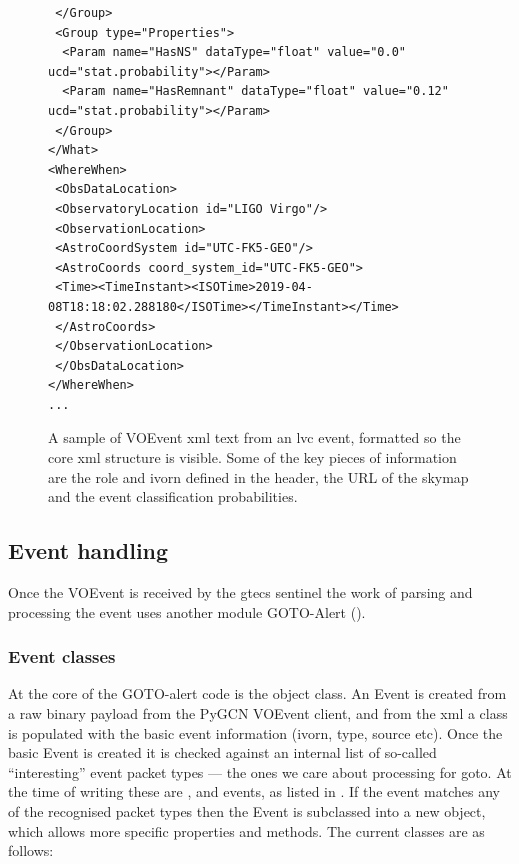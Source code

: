 \begin{colsection}
\begin{colsection}
\begin{figure}[p]
\begin{lstlisting}
 </Group>
 <Group type="Properties">
  <Param name="HasNS" dataType="float" value="0.0" ucd="stat.probability"></Param>
  <Param name="HasRemnant" dataType="float" value="0.12" ucd="stat.probability"></Param>
 </Group>
</What>
<WhereWhen>
 <ObsDataLocation>
 <ObservatoryLocation id="LIGO Virgo"/>
 <ObservationLocation>
 <AstroCoordSystem id="UTC-FK5-GEO"/>
 <AstroCoords coord_system_id="UTC-FK5-GEO">
 <Time><TimeInstant><ISOTime>2019-04-08T18:18:02.288180</ISOTime></TimeInstant></Time>
 </AstroCoords>
 </ObservationLocation>
 </ObsDataLocation>
</WhereWhen>
...
\end{lstlisting}
\caption[VOEvent XML sample]{A sample of VOEvent \gls{xml} text from an \gls{lvc} event, formatted so the core \gls{xml} structure is visible. Some of the key pieces of information are the role and \gls{ivorn} defined in the header, the URL of the skymap and the event classification probabilities.
}
\label{fig:voevent_xml}
\end{figure}

\newpage

\end{colsection}


\subsection{Event handling}
\label{sec:event_handling}
\begin{colsection}

Once the VOEvent is received by the \gls{gtecs} sentinel the work of parsing and processing the event uses another  module GOTO-Alert ().

\subsubsection{Event classes}

At the core of the GOTO-alert code is the  object class. An Event is created from a raw binary payload from the PyGCN VOEvent client, and from the \gls{xml} a  class is populated with the basic event information (\gls{ivorn}, type, source etc). Once the basic Event is created it is checked against an internal list of so-called ``interesting'' event packet types --- the ones we care about processing for \gls{goto}. At the time of writing these are ,  and  events, as listed in . If the event matches any of the recognised packet types then the Event is subclassed into a new object, which allows more specific properties and methods. The current classes are as follows:


\end{colsection}
\end{colsection}
